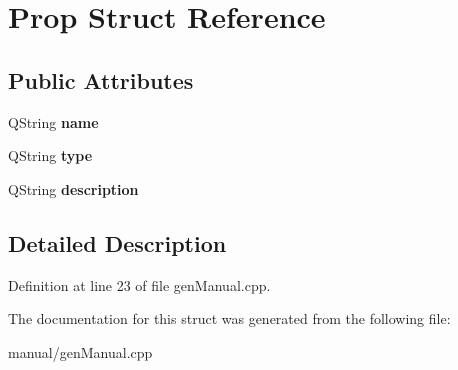 \hypertarget{struct_prop}{}\section{Prop Struct Reference}
\label{struct_prop}
\subsection*{Public Attributes}
\begin{DoxyCompactItemize}
\item 
\mbox{\label{struct_prop_a55b1dfad078ee270cb14131d81f8064d}} 
Q\+String {\bfseries name}
\item 
\mbox{\label{struct_prop_abcb05278de2510c303c6cf70d33f1695}} 
Q\+String {\bfseries type}
\item 
\mbox{\label{struct_prop_a16e53127bb4b115ecec687fb26db6d3c}} 
Q\+String {\bfseries description}
\end{DoxyCompactItemize}


\subsection{Detailed Description}


Definition at line 23 of file gen\+Manual.\+cpp.



The documentation for this struct was generated from the following file\+:\begin{DoxyCompactItemize}
\item 
manual/gen\+Manual.\+cpp\end{DoxyCompactItemize}
